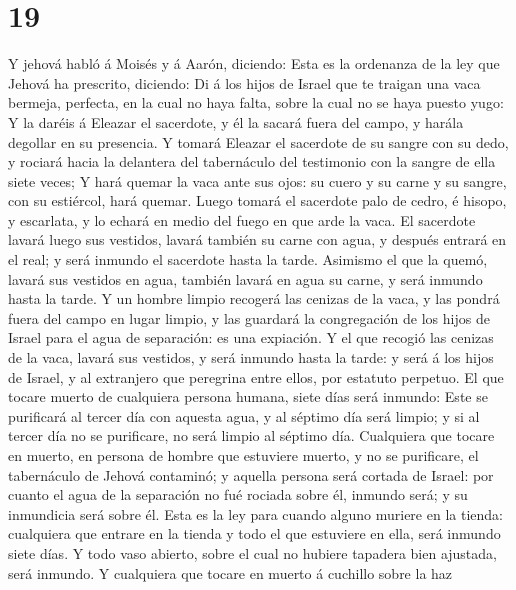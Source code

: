 \hypertarget{section-18}{%
\section{19}\label{section-18}}

 Y jehová habló á Moisés y á Aarón, diciendo: 
Esta es la ordenanza de la ley que Jehová ha prescrito, diciendo: Di á
los hijos de Israel que te traigan una vaca bermeja, perfecta, en la
cual no haya falta, sobre la cual no se haya puesto yugo:  Y
la daréis á Eleazar el sacerdote, y él la sacará fuera del campo, y
harála degollar en su presencia.  Y tomará Eleazar el
sacerdote de su sangre con su dedo, y rociará hacia la delantera del
tabernáculo del testimonio con la sangre de ella siete veces;
 Y hará quemar la vaca ante sus ojos: su cuero y su carne y
su sangre, con su estiércol, hará quemar.  Luego tomará el
sacerdote palo de cedro, é hisopo, y escarlata, y lo echará en medio del
fuego en que arde la vaca.  El sacerdote lavará luego sus
vestidos, lavará también su carne con agua, y después entrará en el
real; y será inmundo el sacerdote hasta la tarde.  Asimismo
el que la quemó, lavará sus vestidos en agua, también lavará en agua su
carne, y será inmundo hasta la tarde.  Y un hombre limpio
recogerá las cenizas de la vaca, y las pondrá fuera del campo en lugar
limpio, y las guardará la congregación de los hijos de Israel para el
agua de separación: es una expiación.  Y el que recogió las
cenizas de la vaca, lavará sus vestidos, y será inmundo hasta la tarde:
y será á los hijos de Israel, y al extranjero que peregrina entre ellos,
por estatuto perpetuo.  El que tocare muerto de cualquiera
persona humana, siete días será inmundo:  Este se
purificará al tercer día con aquesta agua, y al séptimo día será limpio;
y si al tercer día no se purificare, no será limpio al séptimo día.
 Cualquiera que tocare en muerto, en persona de hombre que
estuviere muerto, y no se purificare, el tabernáculo de Jehová
contaminó; y aquella persona será cortada de Israel: por cuanto el agua
de la separación no fué rociada sobre él, inmundo será; y su inmundicia
será sobre él.  Esta es la ley para cuando alguno muriere
en la tienda: cualquiera que entrare en la tienda y todo el que
estuviere en ella, será inmundo siete días.  Y todo vaso
abierto, sobre el cual no hubiere tapadera bien ajustada, será inmundo.
 Y cualquiera que tocare en muerto á cuchillo sobre la haz
